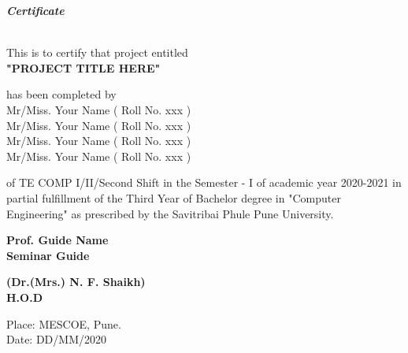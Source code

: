 \documentclass[a4paper, 12pt]{report}
\begin{document}
\begin{frontmatter}
\begin{titlepage}
\begin{center}
        \begin{figure}[h]
            \centering
        \end{figure}

        \begin{LARGE}
            \textbf{\textit {Certificate}}\end{LARGE}\\[1.2cm]
        This is to certify that project entitled\\[0.5cm]\large\textbf{ "PROJECT TITLE HERE"}

        has been completed by \\
        Mr/Miss. Your Name ( Roll No. xxx ) \\
        Mr/Miss. Your Name ( Roll No. xxx ) \\
        Mr/Miss. Your Name ( Roll No. xxx ) \\
        Mr/Miss. Your Name ( Roll No. xxx ) \\
    \end{center}
    of TE COMP I/II/Second Shift in the Semester - I of academic year 2020-2021 in partial fulfillment of the Third Year of Bachelor degree in "Computer Engineering" as prescribed by the Savitribai Phule Pune University.
    \vspace{2cm}
    \begin{multicols}{2}
        \begin{center}
            \textbf{Prof. Guide Name\\Seminar Guide}\hspace{5cm}\\
        \end{center}
        \begin{center}
            \textbf{(Dr.(Mrs.) N. F. Shaikh)\\H.O.D}\\
        \end{center}
        \vspace{0.5cm}
    \end{multicols}
    Place: MESCOE, Pune.\\
    Date: DD/MM/2020 \\
    \vfill
\end{titlepage}


\end{frontmatter}
\end{document}
